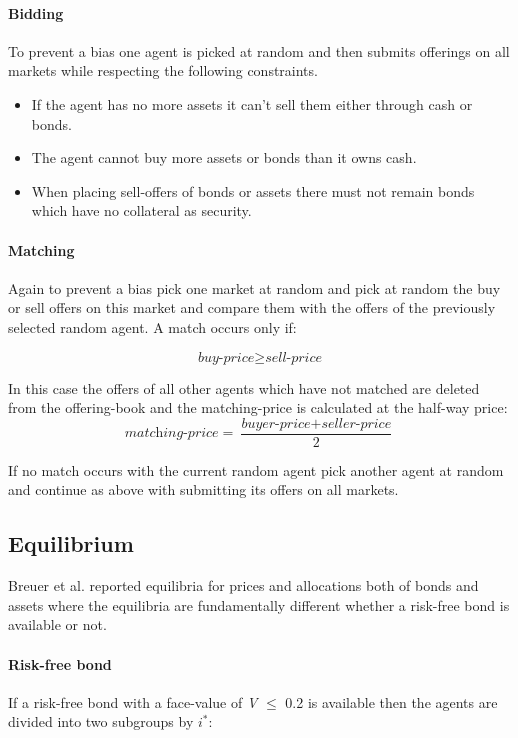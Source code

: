 \documentclass[../Bachelorarbeit.tex]{subfiles}
\begin{document}
\paragraph{Bidding}
To prevent a bias one agent is picked at random and then submits offerings on all markets while respecting the following constraints.

\begin{itemize}
\item If the agent has no more assets it can't sell them either through cash or bonds.
\item The agent cannot buy more assets or bonds than it owns cash.
\item When placing sell-offers of bonds or assets there must not remain bonds which have no collateral as security. 
\end{itemize}

\paragraph{Matching}
Again to prevent a bias pick one market at random and pick at random the buy or sell offers on this market and compare them with the offers of the previously selected random agent. A match occurs only if:

\begin{equation}
\textit{buy-price} \geq \textit{sell-price}
\end{equation}

In this case the offers of all other agents which have not matched are deleted from the offering-book and the matching-price is calculated at the half-way price:
\begin{equation}
\textit{matching-price} = \frac{\textit{buyer-price} + \textit{seller-price}}{2}
\end{equation}

If no match occurs with the current random agent pick another agent at random and continue as above with submitting its offers on all markets.

\subsection{Equilibrium}
\label{sec:EQUILIBRIUM}
Breuer et al. reported equilibria for prices and allocations both of bonds and assets where the equilibria are fundamentally different whether a risk-free bond is available or not.

\paragraph{Risk-free bond}
If a risk-free bond with a face-value of \textit{V} $\leq$ 0.2 is available then the agents are divided into two subgroups by $i^*$:
\end{document}
